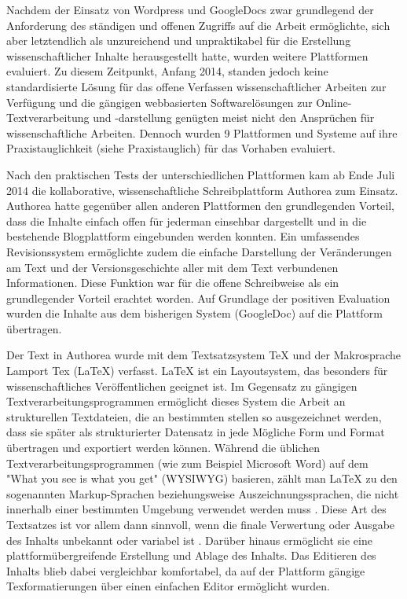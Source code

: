 Nachdem der Einsatz von Wordpress und GoogleDocs zwar grundlegend der Anforderung des ständigen und offenen Zugriffs auf die Arbeit ermöglichte, sich aber letztendlich als unzureichend und unpraktikabel für die Erstellung wissenschaftlicher Inhalte herausgestellt hatte, wurden weitere Plattformen evaluiert. Zu diesem Zeitpunkt, Anfang 2014, standen jedoch keine standardisierte Lösung für das offene Verfassen wissenschaftlicher Arbeiten zur Verfügung und die gängigen webbasierten Softwarelösungen zur Online-Textverarbeitung und -darstellung genügten meist nicht den Ansprüchen für wissenschaftliche Arbeiten. Dennoch wurden 9 Plattformen und Systeme auf ihre Praxistauglichkeit (siehe Praxistauglich) für das Vorhaben evaluiert.

Nach den praktischen Tests der unterschiedlichen Plattformen kam ab Ende Juli 2014 die kollaborative, wissenschaftliche Schreibplattform Authorea zum Einsatz. Authorea hatte gegenüber allen anderen Plattformen den grundlegenden Vorteil, dass die Inhalte einfach offen für jederman einsehbar dargestellt und in die bestehende Blogplattform eingebunden werden konnten. Ein umfassendes Revisionssystem ermöglichte zudem die einfache Darstellung der Veränderungen am Text und der Versionsgeschichte aller mit dem Text verbundenen Informationen. Diese Funktion war für die offene Schreibweise als ein grundlegender Vorteil erachtet worden. Auf Grundlage der positiven Evaluation wurden die Inhalte aus dem bisherigen System (GoogleDoc) auf die Plattform übertragen.

Der Text in Authorea wurde mit dem Textsatzsystem TeX und der Makrosprache Lamport Tex (LaTeX) verfasst. LaTeX ist ein Layoutsystem, das besonders für wissenschaftliches Veröffentlichen geeignet ist. Im Gegensatz zu gängigen Textverarbeitungsprogrammen ermöglicht dieses System die Arbeit an strukturellen Textdateien, die an bestimmten stellen so ausgezeichnet werden, dass sie später als strukturierter Datensatz in jede Mögliche Form und Format übertragen und exportiert werden können. Während die üblichen Textverarbeitungsprogrammen (wie zum Beispiel Microsoft Word) auf dem "What you see is what you get" (WYSIWYG) basieren, zählt man LaTeX zu den sogenannten Markup-­Sprachen beziehungsweise Auszeichnungssprachen, die nicht innerhalb einer bestimmten Umgebung verwendet werden muss \cite{Sievers_2012}. Diese Art des Textsatzes ist vor allem dann sinnvoll, wenn die finale Verwertung oder Ausgabe des Inhalts unbekannt oder variabel ist \cite{braune_2007_latex}. Darüber hinaus ermöglicht sie eine plattformübergreifende Erstellung und Ablage des Inhalts. Das Editieren des Inhalts blieb dabei vergleichbar komfortabel, da auf der Plattform gängige Texformatierungen über einen einfachen Editor ermöglicht wurden.

